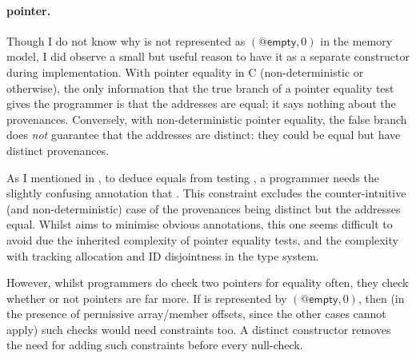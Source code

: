 \paragraph{ pointer.}%
Though I do not know why  is not represented as
$(@\mathsf{empty}, 0)$ in the memory model, I did observe a
small but useful reason to have it as a separate constructor during
implementation. With pointer equality in C (non-deterministic or otherwise),
the only information that the true branch of a pointer equality test gives the
programmer is that the addresses are equal; it says nothing about the
provenances. Conversely, with non-deterministic pointer equality, the false
branch does \emph{not} guarantee that the addresses are distinct: they could be
equal but have distinct provenances.

As I mentioned in , to deduce  equals
 from testing , a programmer needs the slightly
confusing annotation that .%
This constraint excludes the counter-intuitive (and non-deterministic) case of
the provenances being distinct but the addresses equal. Whilst  aims to minimise
obvious annotations, this one seems difficult to avoid due the
inherited complexity of pointer equality tests, and the complexity with
tracking allocation and ID disjointness in the type system.

However, whilst programmers do check two pointers for equality often, they
check whether or not pointers are  far more. If  is
represented by $(@\mathsf{empty}, 0)$, then (in the presence of permissive
array/member offsets, since the other cases cannot apply) such checks would
need constraints too. A distinct  constructor removes the need
for adding such constraints before every null-check.

